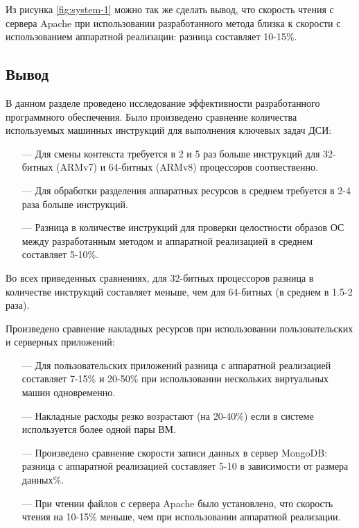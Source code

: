 Из рисунка \ref{fig:system-1} можно так же сделать вывод, что скорость чтения с сервера Apache при использовании разработанного метода близка к скорости с использованием аппаратной реализации: разница составляет 10-15\%.

\subsection*{Вывод}

В данном разделе проведено исследование эффективности разработанного программного обеспечения. Было произведено сравнение количества используемых машинных инструкций для выполнения ключевых задач ДСИ: 

\begin{itemize}
	\item [---] Для смены контекста требуется в 2 и 5 раз больше инструкций для 32-битных (ARMv7) и 64-битных (ARMv8) процессоров соотвественно.
	\item [---] Для обработки разделения аппаратных ресурсов в среднем требуется в 2-4 раза больше инструкций.
	\item [---] Разница в количестве инструкций для проверки целостности образов ОС между разработанным методом и аппаратной реализацией в среднем составляет 5-10\%.
\end{itemize}

Во всех приведенных сравнениях, для 32-битных процессоров разница в количестве инструкций составляет меньше, чем для 64-битных (в среднем в 1.5-2 раза). 

Произведено сравнение накладных ресурсов при использовании пользовательских и серверных приложений:

\begin{itemize}
	\item [---] Для пользовательских приложений разница с аппаратной реализацией составляет 7-15\% и 20-50\% при использовании нескольких виртуальных машин одновременно.
	\item [---] Накладные расходы резко возрастают (на 20-40\%) если в системе используется более одной пары ВМ.
	\item [---] Произведено сравнение скорости записи данных в сервер MongoDB: разница с аппаратной реализацией составляет 5-10 в зависимости от размера данных\%.
	\item [---] При чтении файлов с сервера Apache было установлено, что скорость чтения на 10-15\% меньше, чем при использовании аппаратной реализации.
\end{itemize}

\pagebreak
